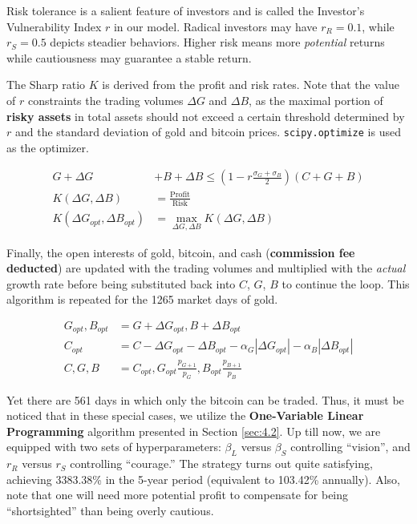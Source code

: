\documentclass{mcmthesis}
\begin{document}
	Risk tolerance is a salient feature of investors and is called the Investor's Vulnerability Index $r$ in our model. Radical investors may have $r_R=0.1$, while $r_S=0.5$ depicts steadier behaviors. Higher risk means more \textit{potential} returns while cautiousness may guarantee a stable return. 
	
	The Sharp ratio $K$ is derived from the profit and risk rates. Note that the value of $r$ constraints the trading volumes $\Delta G$ and $\Delta B$, as the maximal portion of \textbf{risky assets} in total assets should not exceed a certain threshold determined by $r$ and the standard deviation of gold and bitcoin prices. \verb|scipy.optimize| is used as the optimizer. 
	
	\begin{align}
		G+\Delta G&+B+\Delta B \le (1-r\frac{\sigma_G+\sigma_B}{2})\left(C+G+B\right) \\
		K\left(\Delta G, \Delta B\right) & = \frac {\textrm{Profit}} {\textrm{Risk}} \\
		K\left(\Delta G_{opt}, \Delta B_{opt}\right) & = \mathop{\max}_{\Delta G, \Delta B} K\left(\Delta G, \Delta B\right)
	\end{align}
	
	Finally, the open interests of gold, bitcoin, and cash (\textbf{commission fee deducted}) are updated with the trading volumes and multiplied with the \textit{actual} growth rate before being substituted back into $C$, $G$, $B$ to continue the loop. This algorithm is repeated for the 1265 market days of gold. 
	
	\begin{align}
		G_{opt}, B_{opt} & = G + \Delta G_{opt}, B + \Delta B_{opt} \\
		C_{opt} & = C-\Delta G_{opt}-\Delta B_{opt}-\alpha_G\left|\Delta G_{opt}\right|-\alpha_B\left|\Delta B_{opt}\right| \\
		C, G, B & = C_{opt}, G_{opt} \frac{p_{G+1}}{p_G}, B_{opt} \frac{p_{B+1}}{p_B}
	\end{align}
	
	Yet there are 561 days in which only the bitcoin can be traded. Thus, it must be noticed that in these special cases, we utilize the \textbf{One-Variable Linear Programming} algorithm presented in Section \ref{sec:4.2}. Up till now, we are equipped with two sets of hyperparameters: $\beta_L$ versus $\beta_S$ controlling ``vision'', and $r_R$ versus $r_S$ controlling ``courage.'' The strategy turns out quite satisfying, achieving 3383.38\% in the 5-year period (equivalent to 103.42\% annually). Also, note that one will need more potential profit to compensate for being ``shortsighted'' than being overly cautious. 
	
\end{document}
